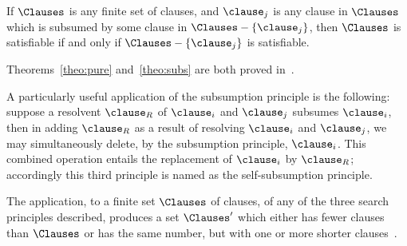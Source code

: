 \begin{theorem}%
    \label{theo:subs}
    If $\Clauses$ is any finite set of clauses, and $\clause_j$ is any clause
    in $\Clauses$ which is subsumed by some clause in $\Clauses -
    \{\clause_j\}$, then $\Clauses$ is satisfiable if and only if $\Clauses -
    \{\clause_j\}$ is satisfiable.
\end{theorem}

Theorems~\ref{theo:pure} and~\ref{theo:subs} are both proved in~\cite{Robinson65}.

A particularly useful application of the subsumption principle is the following:
suppose a resolvent $\clause_R$ of $\clause_i$ and $\clause_j$ subsumes
$\clause_i$, then in adding $\clause_R$ as a result of resolving $\clause_i$ and
$\clause_j$, we may simultaneously delete, by the subsumption principle,
$\clause_i$. This combined operation entails the replacement of $\clause_i$ by
$\clause_R$; accordingly this third principle is named as the
self-subsumption principle.

The application, to a finite set $\Clauses$ of clauses, of any of the three
search principles described, produces a set $\Clauses'$ which either has fewer
clauses than $\Clauses$ or has the same number, but with one or more shorter
clauses~\cite{Robinson65}. 

